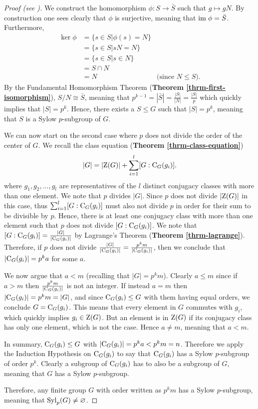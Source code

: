 \begin{proof}[Proof (see {\cite[pp.~1--3]{mann_2011}})]
    We construct the homomorphism $\phi: S \to \bar{S}$ such that $g \mapsto gN$. By construction one sees clearly that $\phi$ is surjective, meaning that $\mathrm{im}\; \phi = \bar{S}$. Furthermore,
    \begin{align*}
        \ker\phi &= \{s \in S \vert \phi(s) = N\}\\
        &= \{s \in S \vert sN = N \}\\
        &= \{s \in S \vert s \in N \}\\
        &= S \cap N\\
        &= N & \text{(since } N \leq S).
    \end{align*}
    By the Fundamental Homomorphism Theorem (\textbf{Theorem \ref{thrm-first-isomorphism}}), $S/N \cong \bar{S}$, meaning that $p^{k-1} = |\bar{S}| = \frac{|S|}{|N|} = \frac{|S|}{p}$ which quickly implies that $|S| = p^k$. Hence, there exists a $S \leq G$ such that $|S| = p^k$, meaning that $S$ is a Sylow $p$-subgroup of $G$.

    We can now start on the second case where $p$ does not divide the order of the center of $G$. We recall the class equation (\textbf{Theorem \ref{thrm-class-equation}})
    \[
        |G| = |\mathrm{Z}(G)| + \sum_{i=1}^l [G:\mathrm{C}_{G}(g_i)].
    \]
    where $g_1, g_2, \dots, g_l$ are representatives of the $l$ distinct conjugacy classes with more than one element. We note that $p$ divides $|G|$. Since $p$ does not divide $|\mathrm{Z}(G)|$ in this case, thus $\sum_{i=1}^l [G:\mathrm{C}_{G}(g_i)]$ must also not divide $p$ in order for their sum to be divisible by $p$. Hence, there is at least one conjugacy class with more than one element such that $p$ does not divide $[G:\mathrm{C}_{G}(g_i)]$. We note that $[G:\mathrm{C}_{G}(g_i)] = \frac{|G|}{|\mathrm{C}_{G}(g_i)|}$ by Lagrange's Theorem (\textbf{Theorem \ref{thrm-lagrange}}). Therefore, if $p$ does not divide $\frac{|G|}{|\mathrm{C}_{G}(g_i)|} = \frac{p^k m}{|\mathrm{C}_{G}(g_i)|}$, then we conclude that $|\mathrm{C}_{G}(g_i)| = p^ka$ for some $a$.

    We now argue that $a < m$ (recalling that $|G| = p^km$). Clearly $a \leq m$ since if $a > m$ then $\frac{p^k m}{|\mathrm{C}_{G}(g_i)|}$ is not an integer. If instead $a = m$ then $|\mathrm{C}_{G}(g_i)| = p^km = |G|$, and since $\mathrm{C}_{G}(g_i) \leq G$ with them having equal orders, we conclude $G = \mathrm{C}_{G}(g_i)$. This means that every element in $G$ commutes with $g_i$, which quickly implies $g_i \in \mathrm{Z}(G)$. But an element is in $\mathrm{Z}(G)$ if its conjugacy class has only one element, which is not the case. Hence $a \neq m$, meaning that $a < m$.

    In summary, $\mathrm{C}_{G}(g_i) \leq G$ with $|\mathrm{C}_{G}(g_i)| = p^ka < p^km = n$. Therefore we apply the Induction Hypothesis on $\mathrm{C}_{G}(g_i)$ to say that $\mathrm{C}_{G}(g_i)$ has a Sylow $p$-subgroup of order $p^k$. Clearly a subgroup of $\mathrm{C}_{G}(g_i)$ has to also be a subgroup of $G$, meaning that $G$ has a Sylow $p$-subgroup.

    Therefore, any finite group $G$ with order written as $p^k m$ has a Sylow $p$-subgroup, meaning that $\mathrm{Syl}_{p}(G) \neq \varnothing$.
\end{proof}


